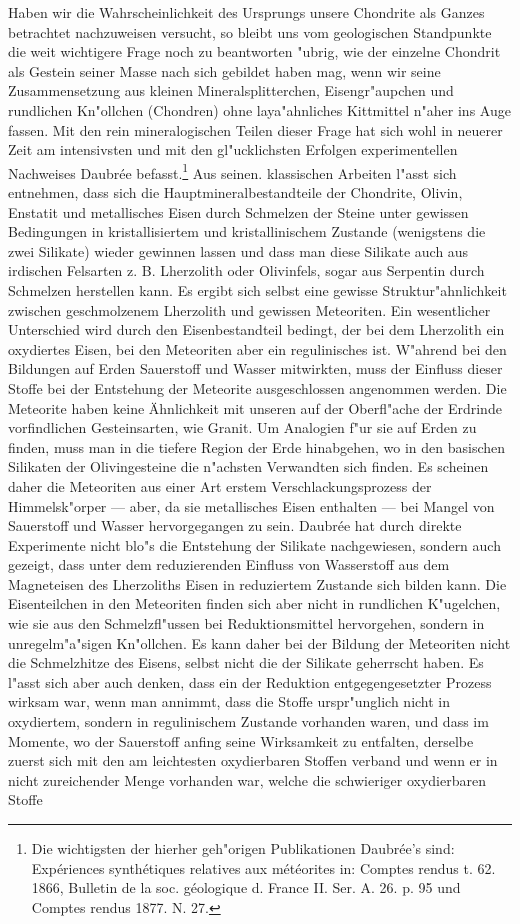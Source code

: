 \documentclass[a4paper, 11pt, oneside]{article}
\begin{document}
Haben wir die Wahrscheinlichkeit des Ursprungs unsere Chondrite als Ganzes betrachtet nachzuweisen versucht, so bleibt uns vom geologischen Standpunkte die weit wichtigere Frage noch zu beantworten "ubrig, wie der einzelne Chondrit als Gestein seiner Masse nach sich gebildet haben mag, wenn wir seine Zusammensetzung aus kleinen Mineralsplitterchen, Eisengr"aupchen und rundlichen Kn"ollchen (Chondren) ohne laya"ahnliches Kittmittel n"aher ins Auge fassen. Mit den rein mineralogischen Teilen dieser Frage hat sich wohl in neuerer Zeit am intensivsten und mit den gl"ucklichsten Erfolgen experimentellen Nachweises Daubrée befasst.\footnote{Die wichtigsten der hierher geh"origen Publikationen Daubrée's sind: Expériences synthétiques relatives aux météorites in: Comptes rendus t. 62. 1866, Bulletin de la soc. géologique d. France II. Ser. A. 26. p. 95 und Comptes rendus 1877. N. 27.} Aus seinen. klassischen Arbeiten l"asst sich entnehmen, dass sich die Hauptmineralbestandteile der Chondrite, Olivin, Enstatit und metallisches Eisen durch Schmelzen der Steine unter gewissen Bedingungen in kristallisiertem und kristallinischem Zustande (wenigstens die zwei Silikate) wieder gewinnen lassen und dass man diese Silikate auch aus irdischen Felsarten z. B. Lherzolith oder Olivinfels, sogar aus Serpentin durch Schmelzen herstellen kann. Es ergibt sich selbst eine gewisse Struktur"ahnlichkeit zwischen geschmolzenem Lherzolith und gewissen Meteoriten. Ein wesentlicher Unterschied wird durch den Eisenbestandteil bedingt, der bei dem Lherzolith ein oxydiertes Eisen, bei den Meteoriten aber ein regulinisches ist. W"ahrend bei den Bildungen auf Erden Sauerstoff und Wasser mitwirkten, muss der Einfluss dieser Stoffe bei der Entstehung der Meteorite ausgeschlossen angenommen werden. Die Meteorite haben keine Ähnlichkeit mit unseren auf der Oberfl"ache der Erdrinde vorfindlichen Gesteinsarten, wie Granit. Um Analogien f"ur sie auf Erden zu finden, muss man in die tiefere Region der Erde hinabgehen, wo in den basischen Silikaten der Olivingesteine die n"achsten Verwandten sich finden. Es scheinen daher die Meteoriten aus einer Art erstem Verschlackungsprozess der Himmelsk"orper --- aber, da sie metallisches Eisen enthalten --- bei Mangel von Sauerstoff und Wasser hervorgegangen zu sein. Daubrée hat durch direkte Experimente nicht blo"s die Entstehung der Silikate nachgewiesen, sondern auch gezeigt, dass unter dem reduzierenden Einfluss von Wasserstoff aus dem Magneteisen des Lherzoliths Eisen in reduziertem Zustande sich bilden kann. Die Eisenteilchen in den Meteoriten finden sich aber nicht in rundlichen K"ugelchen, wie sie aus den Schmelzfl"ussen bei Reduktionsmittel hervorgehen, sondern in unregelm"a"sigen Kn"ollchen. Es kann daher bei der Bildung der Meteoriten nicht die Schmelzhitze des Eisens, selbst nicht die der Silikate geherrscht haben. Es l"asst sich aber auch denken, dass ein der Reduktion entgegengesetzter Prozess wirksam war, wenn man annimmt, dass die Stoffe urspr"unglich nicht in oxydiertem, sondern in regulinischem Zustande vorhanden waren, und dass im Momente, wo der Sauerstoff anfing seine Wirksamkeit zu entfalten, derselbe zuerst sich mit den am leichtesten oxydierbaren Stoffen verband und wenn er in nicht zureichender Menge vorhanden war, welche die schwieriger oxydierbaren Stoffe 
\end{document}
